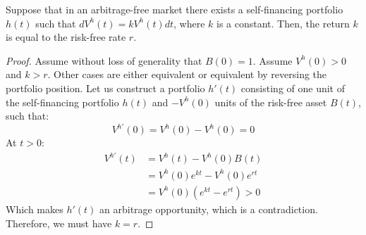 \begin{lemma}
    \label{lem:risk_free}
    Suppose that in an arbitrage-free market there exists a self-financing portfolio $h(t)$ such that $dV^h(t) = k V^h(t) dt$, where $k$ is a constant. Then, the return $k$ is equal to the risk-free rate $r$.
\end{lemma}
\begin{proof}
    Assume without loss of generality that $B(0) = 1$. Assume $V^h(0) > 0$ and $k>r$. Other cases are either equivalent or equivalent by reversing the portfolio position.
    Let us construct a portfolio $h'(t)$ consisting of one unit of the self-financing portfolio $h(t)$ and $-V^h(0)$ units of the risk-free asset $B(t)$, such that:
    \begin{equation}
        V^{h'}(0) = V^h(0)-V^h(0) = 0
    \end{equation}
    At $t>0$:
    \begin{equation}
        \begin{aligned}
            V^{h'}(t) &= V^h(t) - V^h(0)B(t)\\
            &= V^h(0)e^{kt} - V^h(0)e^{rt}\\
            &= V^h(0)(e^{kt} - e^{rt}) > 0
        \end{aligned}
    \end{equation}
    Which makes $h'(t)$ an arbitrage opportunity, which is a contradiction. Therefore, we must have $k = r$.
\end{proof}

